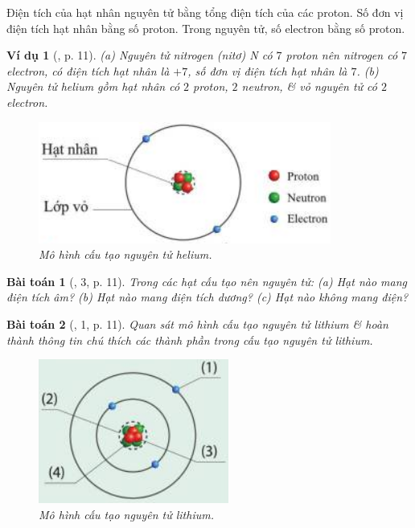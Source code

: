 \documentclass{article}
\newtheorem{baitoan}{Bài toán}
\newtheorem{vidu}{Ví dụ}
\begin{document}
Điện tích của hạt nhân nguyên tử bằng tổng điện tích của các proton. Số đơn vị điện tích hạt nhân bằng số proton. Trong nguyên tử, số electron bằng số proton.

\begin{vidu}[\cite{SGK_KHTN_7_Canh_Dieu}, p. 11]
	(a) Nguyên tử nitrogen (nitơ) \emph{N} có $7$ proton nên nitrogen có $7$ electron, có điện tích hạt nhân là $+7$, số đơn vị điện tích hạt nhân là $7$. (b) Nguyên tử helium gồm hạt nhân có $2$ proton, $2$ neutron, \& vỏ nguyên tử có $2$ electron.
	\begin{figure}[H]
		\centering
		\includegraphics[scale=0.4]{helium}
		\caption{Mô hình cấu tạo nguyên tử helium.}
	\end{figure}
\end{vidu}

\begin{baitoan}[\cite{SGK_KHTN_7_Canh_Dieu}, 3, p. 11]
	Trong các hạt cấu tạo nên nguyên tử: (a) Hạt nào mang điện tích âm? (b) Hạt nào mang điện tích dương? (c) Hạt nào không mang điện?
\end{baitoan}

\begin{baitoan}[\cite{SGK_KHTN_7_Canh_Dieu}, 1, p. 11]
	Quan sát mô hình cấu tạo nguyên tử lithium \& hoàn thành thông tin chú thích các thành phần trong cấu tạo nguyên tử lithium.
	\begin{figure}[H]
		\centering
		\includegraphics[scale=0.4]{lithium}
		\caption{Mô hình cấu tạo nguyên tử lithium.}
	\end{figure}
\end{baitoan}
	
\end{document}
